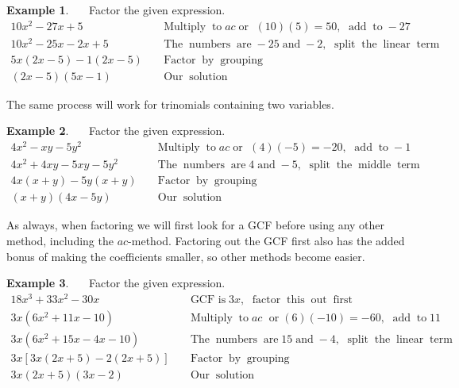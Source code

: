 \documentclass[12pt]{book}
\theoremstyle{definition}
\newtheorem{example}{Example}
\newcommand{\tmop}[1]{\ensuremath{\operatorname{#1}}}
\begin{document}
\begin{example}~~~Factor the given expression.
  \begin{eqnarray*}
    10 x^2 - 27 x + 5 &  & \tmop{Multiply} \tmop{to} a c \tmop{or~} (10) (5) =
    50, \tmop{~add} \tmop{to} - 27\\
    10 x^2 - 25 x - 2 x + 5 &  & \tmop{The} \tmop{numbers} \tmop{are} - 25
    \tmop{and} - 2, \tmop{~split} \tmop{the} \tmop{linear} \tmop{term}\\
    5 x (2 x - 5) - 1 (2 x - 5) &  & \tmop{Factor} \tmop{by} \tmop{grouping}\\
    (2 x - 5) (5 x - 1) &  & \tmop{Our} \tmop{solution}
  \end{eqnarray*}
\end{example}
The same process will work for trinomials containing two variables.
\begin{example}~~~Factor the given expression.
  \begin{eqnarray*}
    4 x^2 - x y - 5 y^2 &  & \tmop{Multiply} \tmop{to} a c \tmop{or~} (4) (- 5)
    = - 20, \tmop{~add} \tmop{to} - 1\\
    4 x^2 + 4 x y - 5 x y - 5 y^2 &  & \tmop{The} \tmop{numbers} \tmop{are} 4
    \tmop{and} - 5, \tmop{~split} \tmop{the} \tmop{middle} \tmop{term}\\
    4 x (x + y) - 5 y (x + y) &  & \tmop{Factor} \tmop{by} \tmop{grouping}\\
    (x + y) (4 x - 5 y) &  & \tmop{Our} \tmop{solution}
  \end{eqnarray*}
\end{example}
As always, when factoring we will first look for a GCF before using any other method, including the $ac$-method. Factoring out the GCF first also has the added bonus of making the coefficients smaller, so other methods become easier.
\begin{example}~~~Factor the given expression.
  \begin{eqnarray*}
    18 x^3 + 33 x^2 - 30 x &  & \tmop{GCF~is}3 x, \tmop{~factor} \tmop{this}
    \tmop{out} \tmop{first}\\
    3 x (6 x^2 + 11 x - 10) &  & \tmop{Multiply} \tmop{to} a c \tmop{~or} (6)
    (- 10) = - 60, \tmop{~add} \tmop{to} 11\\
    3 x (6 x^2 + 15 x - 4 x - 10) &  & \tmop{The} \tmop{numbers} \tmop{are} 15
    \tmop{and} - 4, \tmop{~split} \tmop{the} \tmop{linear} \tmop{term}\\
    3 x [3 x (2 x + 5) - 2 (2 x + 5)] &  & \tmop{Factor} \tmop{by}
    \tmop{grouping}\\
    3 x (2 x + 5) (3 x - 2) &  & \tmop{Our} \tmop{solution}
  \end{eqnarray*}
\end{example}
\end{document}

